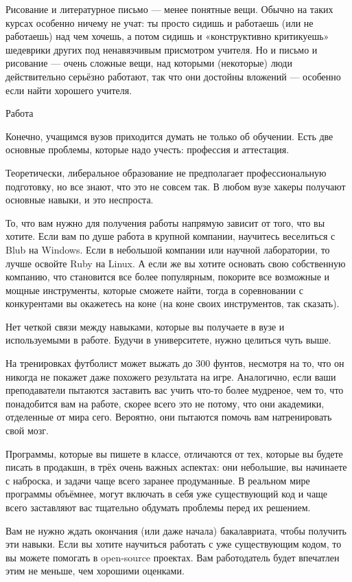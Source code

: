 \documentclass[ebook,12pt,oneside,openany]{memoir}
\begin{document}
Рисование и литературное письмо — менее понятные вещи. Обычно на таких
курсах особенно ничему не учат: ты просто сидишь и работаешь (или не
работаешь) над чем хочешь, а потом сидишь и «конструктивно критикуешь»
шедеврики других под ненавязчивым присмотром учителя. Но и письмо и
рисование — очень сложные вещи, над которыми (некоторые) люди
действительно серьёзно работают, так что они достойны вложений —
особенно если найти хорошего учителя.

Работа

Конечно, учащимся вузов приходится думать не только об обучении. Есть
две основные проблемы, которые надо учесть: профессия и аттестация.

Теоретически, либеральное образование не предполагает профессиональную
подготовку, но все знают, что это не совсем так. В любом вузе хакеры
получают основные навыки, и это неспроста.

То, что вам нужно для получения работы напрямую зависит от того, что
вы хотите. Если вам по душе работа в крупной компании, научитесь
веселиться с Blub на Windows. Если в небольшой компании или научной
лаборатории, то лучше освойте Ruby на Linux. А если же вы хотите
основать свою собственную компанию, что становится все более
популярным, покорите все возможные и мощные инструменты, которые
сможете найти, тогда в соревновании с конкурентами вы окажетесь на
коне (на коне своих инструментов, так сказать).

Нет четкой связи между навыками, которые вы получаете в вузе и
используемыми в работе. Будучи в университете, нужно целиться чуть
выше.

На тренировках футболист может выжать до 300 фунтов, несмотря на то,
что он никогда не покажет даже похожего результата на игре.
Аналогично, если ваши преподаватели пытаются заставить вас учить
что-то более мудреное, чем то, что понадобится вам на работе, скорее
всего это не потому, что они академики, отделенные от мира сего.
Вероятно, они пытаются помочь вам натренировать свой мозг.

Программы, которые вы пишете в классе, отличаются от тех, которые вы
будете писать в продакшн, в трёх очень важных аспектах: они небольшие,
вы начинаете с наброска, и задачи чаще всего заранее продуманные. В
реальном мире программы объёмнее, могут включать в себя уже
существующий код и чаще всего заставляют вас тщательно обдумать
проблемы перед их решением.

Вам не нужно ждать окончания (или даже начала) бакалавриата, чтобы
получить эти навыки. Если вы хотите научиться работать с уже
существующим кодом, то вы можете помогать в open-source проектах. Вам
работодатель будет впечатлен этим не меньше, чем хорошими оценками.
\end{document}
